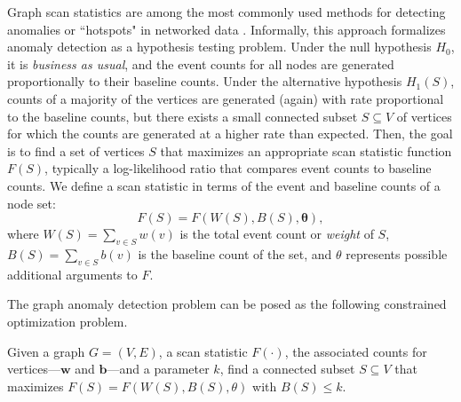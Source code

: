 Graph scan statistics are among the most commonly used methods for detecting anomalies or ``hotspots" in
networked data \cite{Speakman-14,leiserson2015pan, hansen2016finding, neil2013scan, chen2014non}.
Informally, this approach formalizes anomaly detection as a hypothesis testing problem.
Under the null hypothesis $H_0$, it is \emph{business as usual}, and the event counts for all nodes are generated proportionally to their baseline counts. Under the alternative hypothesis $H_1(S)$, counts of a majority of
the vertices are generated (again) with rate proportional to the baseline counts, but there exists a small connected subset
$S \subseteq V$ of vertices for which the counts are generated at a higher rate than expected.
Then, the goal is to find a set of vertices $S$ that maximizes an appropriate scan statistic function $F(S)$, typically a log-likelihood ratio that compares event counts to baseline counts. We define a scan statistic in terms of the event and baseline counts of a node set:
$$
F(S) = F(W(S), B(S), \mathbf{\theta}),
$$
where $W(S) = \sum_{v \in S} w(v)$ is the total event count or \emph{weight} of $S$, $B(S) = \sum_{v \in S} b(v)$ is the baseline count of the set, and $\theta$ represents possible additional arguments to $F$.

The graph anomaly detection problem can be posed as the following constrained optimization problem.

\begin{problem}
\label{prob:macs}
Given a graph $G=(V, E)$, a scan statistic $F(\cdot)$, the associated counts for vertices---$\mathbf{w}$ and $\mathbf{b}$---and a parameter $k$, find a connected subset $S\subseteq V$ that maximizes $F(S) = F(W(S), B(S), \theta)$ with $B(S) \leq k$.
\end{problem}

